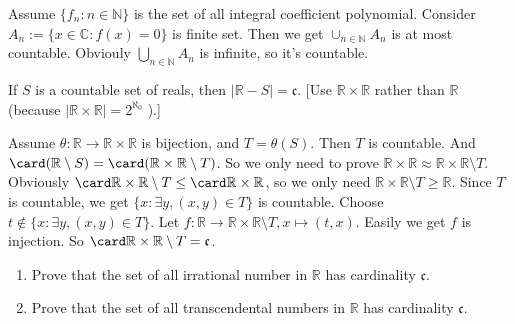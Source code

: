 \documentclass{ctexart}
\begin{document}
\begin{solution}
  Assume \(\{f_n:n \in \mathbb{N}\}\) is the set of all integral coefficient polynomial.
  Consider \(A_n:=\{x \in \mathbb{C}:f(x)=0\}\) is finite set. Then we get \(\cup_{n \in \mathbb{N}}A_n\) is at most countable. 
  Obviouly \(\bigcup_{n \in \mathbb{N} } A_n\) is infinite, so it's countable. 
\end{solution}
\begin{problem}\label{pro:1}
If $S$ is a countable set of reals, then $|\mathbb{R}-S|=\mathfrak{c}$.
[Use $\mathbb{R} \times \mathbb{R}$ rather than $\mathbb{R}$ (because $|\mathbb{R} \times \mathbb{R}|=2^{\aleph_0}$ ).]
\end{problem}

\begin{solution}
  Assume \(\theta:\mathbb{R} \to \mathbb{R} \times \mathbb{R}\) is bijection, and \(T=\theta(S)\). 
  Then \(T\) is countable. And \(\card (\mathbb{R}\setminus S)= \card (\mathbb{R} \times \mathbb{R} \setminus T)\). 
  So we only need to prove \(\mathbb{R}\times \mathbb{R} \approx \mathbb{R} \times \mathbb{R} \setminus T\). 
  Obviously \(\card \mathbb{R}\times \mathbb{R} \setminus T \leq \card \mathbb{R} \times \mathbb{R}\), so we only need
  \(\mathbb{R}\times \mathbb{R} \setminus T \geq \mathbb{R}\). 
  Since \(T\) is countable, we get \(\{x:\exists y,(x,y) \in T\}\) is countable. 
  Choose \(t \notin \{x:\exists y,(x,y) \in T\}\). 
  Let \(f:\mathbb{R} \to \mathbb{R} \times \mathbb{R} \setminus T,x \mapsto (t,x)\). 
  Easily we get \(f\) is injection. So \(\card \mathbb{R} \times \mathbb{R} \setminus T=\mathfrak{c}\). 
\end{solution}

\begin{problem}
  \begin{enumerate}
    \item Prove that the set of all irrational number in \(\mathbb{R}\) has cardinality \(\mathfrak{c}\).  
    \item Prove that the set of all transcendental numbers  in \(\mathbb{R}\) has cardinality \(\mathfrak{c}\). 
  \end{enumerate}
\end{problem}
\end{document}
